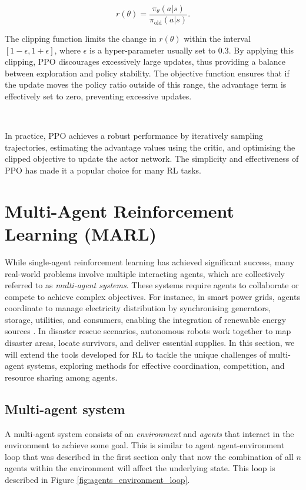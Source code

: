 \documentclass{article}
\begin{document}
\begin{equation}
r(\theta) = \frac{\pi_\theta(a|s)}{\pi_\text{old}(a|s)}.
\end{equation}

The clipping function limits the change in $r(\theta)$ within the interval $[1 - \epsilon, 1 + \epsilon]$, where $\epsilon$ is a hyper-parameter usually set to $0.3$. By applying this clipping, PPO discourages excessively large updates, thus providing a balance between exploration and policy stability. The objective function ensures that if the update moves the policy ratio outside of this range, the advantage term is effectively set to zero, preventing excessive updates.

\

In practice, PPO achieves a robust performance by iteratively sampling trajectories, estimating the advantage values using the critic, and optimising the clipped objective to update the actor network. The simplicity and effectiveness of PPO has made it a popular choice for many RL tasks.

\newpage

\section{Multi-Agent Reinforcement Learning (MARL)}

While single-agent reinforcement learning has achieved significant success, many real-world problems involve multiple interacting agents, which are collectively referred to as \textit{multi-agent systems}. These systems require agents to collaborate or compete to achieve complex objectives. For instance, in smart power grids, agents coordinate to manage electricity distribution by synchronising generators, storage, utilities, and consumers, enabling the integration of renewable energy sources \citep{yu2024safe}. In disaster rescue scenarios, autonomous robots work together to map disaster areas, locate survivors, and deliver essential supplies. \citep{song2023disaster} In this section, we will extend the tools developed for RL to tackle the unique challenges of multi-agent systems, exploring methods for effective coordination, competition, and resource sharing among agents.

\subsection{Multi-agent system}

A multi-agent system consists of an \textit{environment} and \textit{agents} that interact in the environment to achieve some goal. This is similar to agent agent-environment loop that was described in the first section only that now the combination of all $n$ agents within the environment will affect the underlying state. This loop is described in Figure \ref{fig:agents_environment_loop}. 
\end{document}
